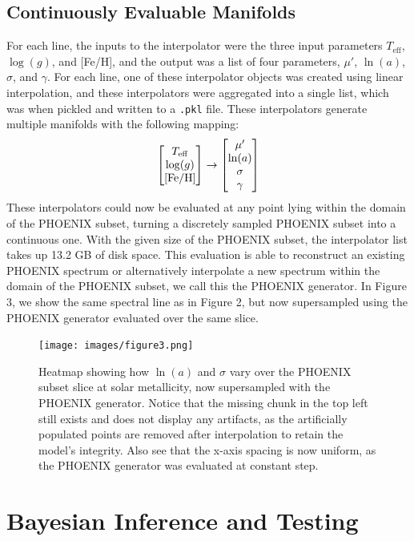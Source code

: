 \documentclass[twocolumn]{aastex631}
\begin{document}
\subsection{Continuously Evaluable Manifolds}
For each line, the inputs to the interpolator were the three input parameters $T_{\mathrm{eff}}$,
$\log(g)$, and [Fe/H], and the output was a list of four parameters, 
$\mu'$, $\ln(a)$, $\sigma$, and $\gamma$. For each line, one of these 
interpolator objects was created using linear interpolation, and these 
interpolators were aggregated into a single list, which was when pickled 
and written to a \texttt{.pkl} file. These interpolators generate multiple 
manifolds with the following mapping:
\begin{gather}
    \mqty[T_{\mathrm{eff}} \\ \log(g) \\ \mathrm{[Fe/H]}] \rightarrow \mqty[\mu' \\ \ln(a) \\ \sigma \\ \gamma]
\end{gather}
These interpolators could now be evaluated at any point lying within the 
domain of the PHOENIX subset, turning a discretely sampled PHOENIX subset 
into a continuous one. With the given size of the PHOENIX subset, the 
interpolator list takes up 13.2 GB of disk space. This evaluation 
is able to reconstruct an existing PHOENIX spectrum or alternatively 
interpolate a new spectrum within the domain of the PHOENIX subset,
we call this the PHOENIX generator. In Figure 3, we show the same 
spectral line as in Figure 2, but now supersampled using the PHOENIX
generator evaluated over the same slice.

\begin{figure}[t!]
    \centering
    \texttt{[image: images/figure3.png]}
    \caption{Heatmap showing how $\ln(a)$ and $\sigma$ vary over the PHOENIX 
    subset slice at solar metallicity, now supersampled with the PHOENIX 
    generator. Notice that the missing chunk in the top left still exists 
    and does not display any artifacts, as the artificially populated points 
    are removed after interpolation to retain the model's integrity. Also
    see that the x-axis spacing is now uniform, as the PHOENIX generator 
    was evaluated at constant step.}
\end{figure}

\section{Bayesian Inference and Testing}
\end{document}
